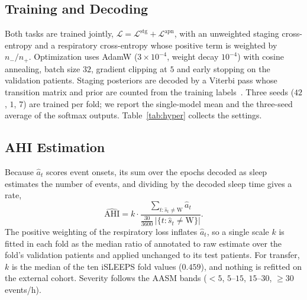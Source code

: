 \documentclass{ieeeaccess}
\begin{document}
\subsection{Training and Decoding}
Both tasks are trained jointly,
$\mathcal{L}=\mathcal{L}^{\mathrm{stg}}+\mathcal{L}^{\mathrm{apn}}$, with an unweighted
staging cross-entropy and a respiratory cross-entropy whose positive term is weighted by
$n_-/n_+$. Optimization uses AdamW ($3\times10^{-4}$, weight decay $10^{-4}$) with cosine
annealing, batch size $32$, gradient clipping at $5$ and early stopping on the validation
patients. Staging posteriors are decoded by a Viterbi pass whose transition matrix and prior are
counted from the training labels~\cite{chen2024hmm}. Three seeds ($42$, $1$, $7$) are trained per
fold; we report the single-model mean and the three-seed average of the softmax outputs.
Table~\ref{tab:hyper} collects the settings.

\subsection{AHI Estimation}
\label{sec:ahimethod}
Because $\hat a_t$ scores event onsets, its sum over the epochs decoded as sleep estimates the
number of events, and dividing by the decoded sleep time gives a rate,
\begin{equation}
\widehat{\mathrm{AHI}}=k\cdot\frac{\sum_{t:\hat s_t\neq\mathrm{W}}\hat a_t}{\tfrac{30}{3600}\,\lvert\{t:\hat s_t\neq\mathrm{W}\}\rvert}.
\end{equation}
The positive weighting of the respiratory loss inflates $\hat a_t$, so a single scale $k$ is
fitted in each fold as the median ratio of annotated to raw estimate over the fold's validation
patients and applied unchanged to its test patients. For transfer, $k$ is the median of the ten
iSLEEPS fold values ($0.459$), and nothing is refitted on the external cohort. Severity follows
the AASM bands ($<5$, $5$--$15$, $15$--$30$, $\geq30$ events/h).
\end{document}
